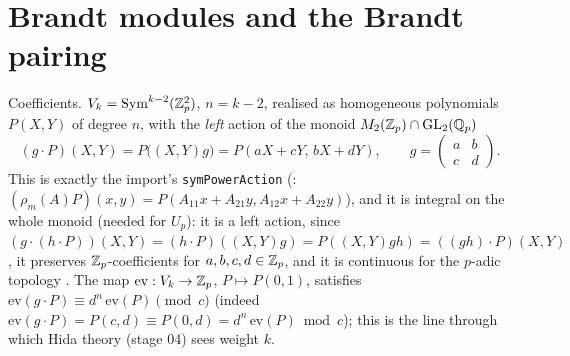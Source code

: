 \section{Brandt modules and the Brandt pairing}

Coefficients. $V_k=\mathrm{Sym}^{k-2}(\mathbb{Z}_p^2)$, $n=k-2$, realised as homogeneous polynomials $P(X,Y)$ of degree $n$, with the
\emph{left} action of the monoid $M_2(\mathbb{Z}_p)\cap\mathrm{GL}_2(\mathbb{Q}_p)$
\begin{equation}\label{eq:s01-Vk}
(g\cdot P)(X,Y)=P\big((X,Y)g\big)=P(aX+cY,\,bX+dY),\qquad g=\left(\begin{smallmatrix}a&b\\c&d\end{smallmatrix}\right).
\end{equation}
This is exactly the import's \texttt{symPowerAction} (: $(\rho_m(A)P)(x,y)=P(A_{11}x+A_{21}y,A_{12}x+A_{22}y)$),
and it is integral on the whole monoid (needed for $U_p$): it is a left action, since
$(g\cdot(h\cdot P))(X,Y)=(h\cdot P)((X,Y)g)=P((X,Y)gh)=((gh)\cdot P)(X,Y)$, it preserves $\mathbb{Z}_p$-coefficients for $a,b,c,d\in\mathbb{Z}_p$, and it is
continuous for the $p$-adic topology \stproved{}. The map $\mathrm{ev}:V_k\to\mathbb{Z}_p$, $P\mapsto P(0,1)$, satisfies
$\mathrm{ev}(g\cdot P)\equiv d^n\,\mathrm{ev}(P)\pmod{c}$ (indeed $\mathrm{ev}(g\cdot P)=P(c,d)\equiv P(0,d)=d^n\,\mathrm{ev}(P)\bmod c$); this is the line through which Hida theory (stage 04) sees weight $k$.

